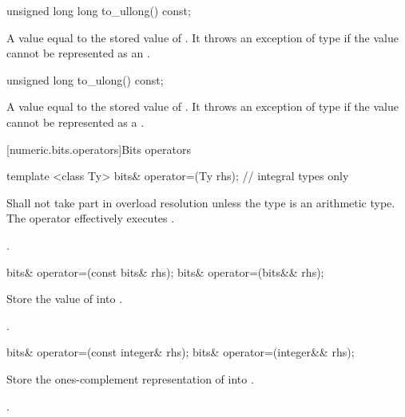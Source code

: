 \begin{itemdecl}
unsigned long long to_ullong() const;	
\end{itemdecl}

\begin{itemdescr}
\returns A value equal to the stored value of . It throws an exception of type  if the value cannot be represented as an .	
\end{itemdescr}

\begin{itemdecl}
unsigned long to_ulong() const;	
\end{itemdecl}

\begin{itemdescr}
\returns A value equal to the stored value of . It throws an exception of type  if the value cannot be represented as a .	
\end{itemdescr}

[numeric.bits.operators]{Bits operators}

\begin{itemdecl}
template <class Ty>
  bits& operator=(Ty rhs);   // integral types only		
\end{itemdecl}

\begin{itemdescr}
\effects Shall not take part in overload resolution unless the type  is an arithmetic type. The operator effectively executes .

\returns {}.		
\end{itemdescr}

\begin{itemdecl}
bits& operator=(const bits& rhs);
bits& operator=(bits&& rhs);		
\end{itemdecl}

\begin{itemdescr}
\effects Store the value of  into .

\returns {}.		
\end{itemdescr}

\begin{itemdecl}
bits& operator=(const integer& rhs);
bits& operator=(integer&& rhs);		
\end{itemdecl}

\begin{itemdescr}
\effects Store the ones-complement representation of  into .

\returns {}.		
\end{itemdescr}

